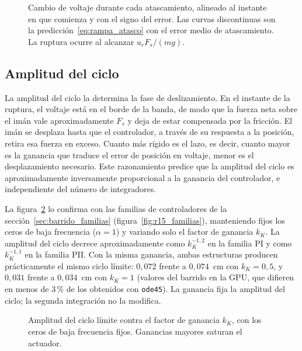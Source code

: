 \begin{figure}[ht]
    \centering
    
    \caption[Voltaje durante el atascamiento]{Cambio de voltaje durante cada atascamiento, alineado al instante en que comienza y con el signo del error. Las curvas discontinuas son la predicción~\eqref{eq:rampa_atasco} con el error medio de atascamiento. La ruptura ocurre al alcanzar $u_eF_s/(mg)$.}
    \label{fig:atasco}
\end{figure}

\subsection{Amplitud del ciclo}

La amplitud del ciclo la determina la fase de deslizamiento. En el instante de la ruptura, el voltaje está en el borde de la banda, de modo que la fuerza neta sobre el imán vale aproximadamente $F_s$ y deja de estar compensada por la fricción. El imán se desplaza hasta que el controlador, a través de su respuesta a la posición, retira esa fuerza en exceso. Cuanto más rígido es el lazo, es decir, cuanto mayor es la ganancia que traduce el error de posición en voltaje, menor es el desplazamiento necesario. Este razonamiento predice que la amplitud del ciclo es aproximadamente inversamente proporcional a la ganancia del controlador, e independiente del número de integradores.

La figura~\ref{fig:ganancia} lo confirma con las familias de controladores de la sección~\ref{sec:barrido_familias} (figura~\ref{fig:r15_familias}), manteniendo fijos los ceros de baja frecuencia ($\alpha=1$) y variando solo el factor de ganancia $k_K$. La amplitud del ciclo decrece aproximadamente como $k_K^{-1{,}2}$ en la familia PI y como $k_K^{-1{,}1}$ en la familia PII. Con la misma ganancia, ambas estructuras producen prácticamente el mismo ciclo límite: $0{,}072$ frente a $0{,}074$~cm con $k_K=0{,}5$, y $0{,}031$ frente a $0{,}034$~cm con $k_K=1$ (valores del barrido en la GPU, que difieren en menos de 3\,\% de los obtenidos con \texttt{ode45}). La ganancia fija la amplitud del ciclo; la segunda integración no la modifica.

\begin{figure}[ht]
    \centering
    
    \caption[Ciclo límite contra la ganancia]{Amplitud del ciclo límite contra el factor de ganancia $k_K$, con los ceros de baja frecuencia fijos. Ganancias mayores saturan el actuador.}
    \label{fig:ganancia}
\end{figure}

